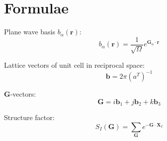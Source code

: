 \section{Formulae}

Plane wave basis $b_{\alpha}(\mathbf{r})$:
\begin{equation}
b_{\alpha}(\mathbf{r}) = \frac{1}{\sqrt{\Omega}} e^{\mathbf{G}_{\alpha}\cdot\mathbf{r}}
\end{equation}

Lattice vectors of unit cell in reciprocal space:
\begin{equation}\label{eq:recvecs}
\mathbf{b} = 2\pi\left( a^{T} \right)^{-1}
\end{equation}

\textbf{G}-vectors:
\begin{equation}
\mathbf{G} = i \mathbf{b}_{1} + j \mathbf{b}_{2} + k \mathbf{b}_{3}
\end{equation}

Structure factor:
\begin{equation}
S_{I}(\mathbf{G}) = \sum_{\mathbf{G}} e^{ -\mathbf{G}\cdot\mathbf{X}_{I} }
\end{equation}
